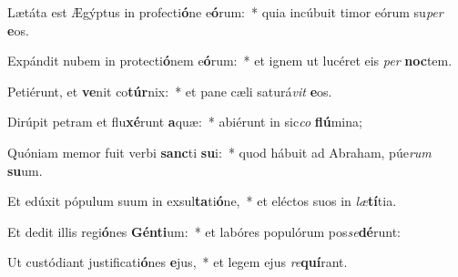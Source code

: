 \item Lætáta est Ægýptus in profecti\textbf{ó}ne e\textbf{ó}rum:~* quia incúbuit timor eórum su\textit{per} \textbf{e}os.
\item Expándit nubem in protecti\textbf{ó}nem e\textbf{ó}rum:~* et ignem ut lucéret eis \textit{per} \textbf{noc}tem.
\item Petiérunt, et \textbf{ve}nit co\textbf{túr}nix:~* et pane cæli saturá\textit{vit} \textbf{e}os.
\item Dirúpit petram et flu\textbf{xé}runt \textbf{a}quæ:~* abiérunt in sic\textit{co} \textbf{flú}mina;
\item Quóniam memor fuit verbi \textbf{sanc}ti \textbf{su}i:~* quod hábuit ad Abraham, púe\textit{rum} \textbf{su}um.
\item Et edúxit pópulum suum in exsul\textbf{ta}ti\textbf{ó}ne,~* et eléctos suos in \textit{læ}\textbf{tí}tia.
\item Et dedit illis regi\textbf{ó}nes \textbf{Gén}\textbf{ti}um:~* et labóres populórum pos\textit{se}\textbf{dé}runt:
\item Ut custódiant justificati\textbf{ó}nes \textbf{e}jus,~* et legem ejus \textit{re}\textbf{quí}rant.
